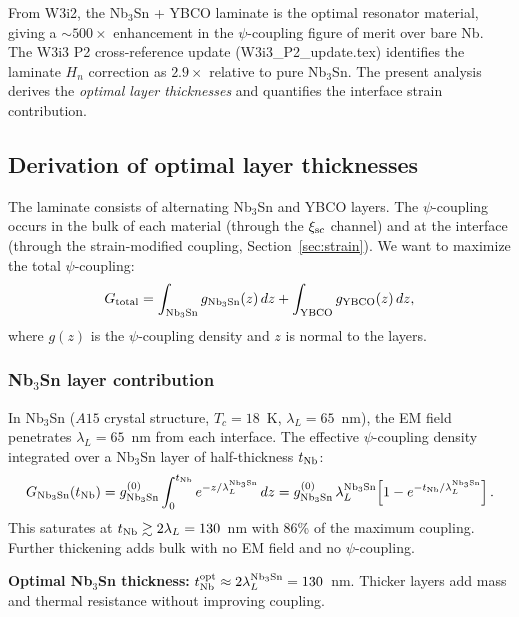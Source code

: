 \documentclass[11pt]{article}
\begin{document}
From W3i2, the Nb$_3$Sn + YBCO laminate is the optimal resonator material,
giving a $\sim 500\times$ enhancement in the $\psi$-coupling figure of merit
over bare Nb. The W3i3 P2 cross-reference update (W3i3\_P2\_update.tex)
identifies the laminate $H_n$ correction as $2.9\times$ relative to pure
Nb$_3$Sn. The present analysis derives the \emph{optimal layer thicknesses}
and quantifies the interface strain contribution.

\subsection{Derivation of optimal layer thicknesses}

The laminate consists of alternating Nb$_3$Sn and YBCO layers. The
$\psi$-coupling occurs in the bulk of each material (through the
$\xi_{\rm sc}$ channel) and at the interface (through the strain-modified
coupling, Section~\ref{sec:strain}). We want to maximize the total
$\psi$-coupling:
\begin{equation}
G_{\rm total} = \int_{\rm Nb_3Sn} g_{\rm Nb_3Sn}(z)\,dz
  + \int_{\rm YBCO} g_{\rm YBCO}(z)\,dz,
\label{eq:G-total}
\end{equation}
where $g(z)$ is the $\psi$-coupling density and $z$ is normal to the layers.

\subsubsection{Nb$_3$Sn layer contribution}

In Nb$_3$Sn ($A15$ crystal structure, $T_c = 18$~K, $\lambda_L = 65$~nm),
the EM field penetrates $\lambda_L = 65$~nm from each interface. The
effective $\psi$-coupling density integrated over a Nb$_3$Sn layer of
half-thickness $t_{\rm Nb}$:
\begin{equation}
G_{\rm Nb_3Sn}(t_{\rm Nb}) = g_{\rm Nb_3Sn}^{(0)} \int_0^{t_{\rm Nb}}
  e^{-z/\lambda_L^{\rm Nb_3Sn}}\,dz
= g_{\rm Nb_3Sn}^{(0)}\,\lambda_L^{\rm Nb_3Sn}\!\left[1 - e^{-t_{\rm Nb}/\lambda_L^{\rm Nb_3Sn}}\right].
\label{eq:G-Nb3Sn}
\end{equation}
This saturates at $t_{\rm Nb} \gtrsim 2\lambda_L = 130$~nm with 86\% of
the maximum coupling. Further thickening adds bulk with no EM field and
no $\psi$-coupling.

\textbf{Optimal Nb$_3$Sn thickness:} $t_{\rm Nb}^{\rm opt} \approx 2\lambda_L^{\rm Nb_3Sn}
= 130$~nm. Thicker layers add mass and thermal resistance without improving coupling.
\end{document}
